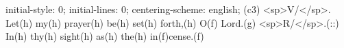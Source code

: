 initial-style: 0;
initial-lines: 0;
centering-scheme: english;
(c3) <sp>V/</sp>. Let(h) my(h) prayer(h) be(h) set(h) forth,(h) O(f) Lord.(g) <sp>R/</sp>.(::) In(h) thy(h) sight(h) as(h) the(h) in(f)cense.(f)
